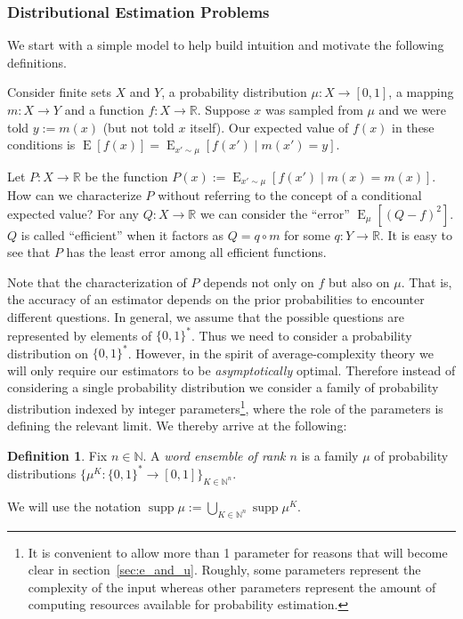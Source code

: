 \documentclass{article}
\numberwithin{equation}{section}
\theoremstyle{definition}
\newtheorem{definition}{Definition}[section]
\theoremstyle{plain}
\newcommand{\Bool}{\{0,1\}}
\newcommand{\Words}{{\Bool^*}}
\DeclareMathOperator{\Supp}{supp}
\DeclareMathOperator{\E}{E}
\newcommand{\Nats}{\mathbb{N}}
\newcommand{\Reals}{\mathbb{R}}
\begin{document}
\subsubsection{Distributional Estimation Problems}

We start with a simple model to help build intuition and motivate the following definitions.

Consider finite sets $X$ and $Y$, a probability distribution $\mu: X \rightarrow [0,1]$, a mapping $m: X \rightarrow Y$ and a function $f: X \rightarrow \Reals$. Suppose $x$ was sampled from $\mu$ and we were told $y := m(x)$ (but not told $x$ itself). Our expected value of $f(x)$ in these conditions is ${\E[f(x)] = \E_{x' \sim \mu}[f(x') \mid m(x') = y]}$.

Let $P: X \rightarrow \Reals$ be the function $P(x) := \E_{x' \sim \mu}[f(x') \mid m(x) = m(x)]$. How can we characterize $P$ without referring to the concept of a conditional expected value? For any $Q: X \rightarrow \Reals$ we can consider the \enquote{error} $\E_\mu[(Q - f)^2]$. $Q$ is called \enquote{efficient} when it factors as $Q = q \circ m$ for some $q: Y \rightarrow \Reals$. It is easy to see that $P$ has the least error among all efficient functions.

Note that the characterization of $P$ depends not only on $f$ but also on $\mu$. That is, the accuracy of an estimator depends on the prior probabilities to encounter different questions. In general, we assume that the possible questions are represented by elements of $\Words$. Thus we need to consider a probability distribution on $\Words$. However, in the spirit of average-complexity theory we will only require our estimators to be \emph{asymptotically} optimal. Therefore instead of considering a single probability distribution we consider a family of probability distribution indexed by integer parameters\footnote{It is convenient to allow more than 1 parameter for reasons that will become clear in section~\ref{sec:e_and_u}. Roughly, some parameters represent the complexity of the input whereas other parameters represent the amount of computing resources available for probability estimation.}, where the role of the parameters is defining the relevant limit. We thereby arrive at the following:

\begin{definition}

Fix ${n \in \Nats}$. A \emph{word ensemble of rank ${n}$} is a family $\mu$ of probability distributions ${\{\mu^{K}: \Words \rightarrow [0,1]\}_{K \in \Nats^n}}$.

We will use the notation $\Supp \mu := \bigcup_{K \in \Nats^n} \Supp \mu^K$.

\end{definition}
\end{document}
